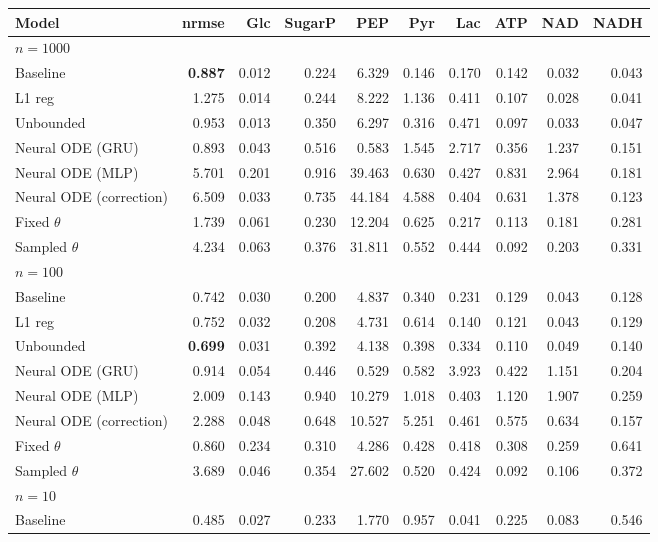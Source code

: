 \begin{tabular}{lrrrrrrrrr}
\toprule
Model & nrmse & Glc & SugarP & PEP & Pyr & Lac & ATP & NAD & NADH \\
\midrule
\multicolumn{10}{l}{\textbf{$n=1000$}} \\
Baseline & \textbf{0.887} & 0.012 & 0.224 & 6.329 & 0.146 & 0.170 & 0.142 & 0.032 & 0.043 \\
L1 reg & 1.275 & 0.014 & 0.244 & 8.222 & 1.136 & 0.411 & 0.107 & 0.028 & 0.041 \\
Unbounded & 0.953 & 0.013 & 0.350 & 6.297 & 0.316 & 0.471 & 0.097 & 0.033 & 0.047 \\
Neural ODE (GRU) & 0.893 & 0.043 & 0.516 & 0.583 & 1.545 & 2.717 & 0.356 & 1.237 & 0.151 \\
Neural ODE (MLP) & 5.701 & 0.201 & 0.916 & 39.463 & 0.630 & 0.427 & 0.831 & 2.964 & 0.181 \\
Neural ODE (correction) & 6.509 & 0.033 & 0.735 & 44.184 & 4.588 & 0.404 & 0.631 & 1.378 & 0.123 \\
Fixed $\theta$ & 1.739 & 0.061 & 0.230 & 12.204 & 0.625 & 0.217 & 0.113 & 0.181 & 0.281 \\
Sampled $\theta$ & 4.234 & 0.063 & 0.376 & 31.811 & 0.552 & 0.444 & 0.092 & 0.203 & 0.331 \\
\midrule
\multicolumn{10}{l}{\textbf{$n=100$}} \\
Baseline & 0.742 & 0.030 & 0.200 & 4.837 & 0.340 & 0.231 & 0.129 & 0.043 & 0.128 \\
L1 reg & 0.752 & 0.032 & 0.208 & 4.731 & 0.614 & 0.140 & 0.121 & 0.043 & 0.129 \\
Unbounded & \textbf{0.699} & 0.031 & 0.392 & 4.138 & 0.398 & 0.334 & 0.110 & 0.049 & 0.140 \\
Neural ODE (GRU) & 0.914 & 0.054 & 0.446 & 0.529 & 0.582 & 3.923 & 0.422 & 1.151 & 0.204 \\
Neural ODE (MLP) & 2.009 & 0.143 & 0.940 & 10.279 & 1.018 & 0.403 & 1.120 & 1.907 & 0.259 \\
Neural ODE (correction) & 2.288 & 0.048 & 0.648 & 10.527 & 5.251 & 0.461 & 0.575 & 0.634 & 0.157 \\
Fixed $\theta$ & 0.860 & 0.234 & 0.310 & 4.286 & 0.428 & 0.418 & 0.308 & 0.259 & 0.641 \\
Sampled $\theta$ & 3.689 & 0.046 & 0.354 & 27.602 & 0.520 & 0.424 & 0.092 & 0.106 & 0.372 \\
\midrule
\multicolumn{10}{l}{\textbf{$n=10$}} \\
Baseline & 0.485 & 0.027 & 0.233 & 1.770 & 0.957 & 0.041 & 0.225 & 0.083 & 0.546 \\

\end{tabular}
